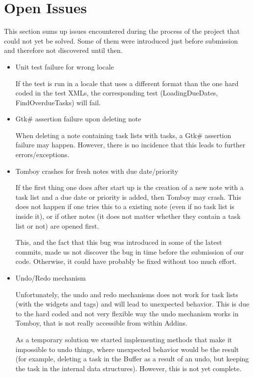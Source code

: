 \section{Open Issues}
\label{issues}

This section sums up issues encountered during the process of the project that could not yet be solved.
Some of them were introduced just before submission and therefore not discovered until then.

\begin{itemize}
\item Unit test failure for wrong locale

  If the test is run in a locale that uses a different format than the one hard coded in the test XMLs, the corresponding test (LoadingDueDates, FindOverdueTasks) will fail.

\item Gtk\# assertion failure upon deleting note

  When deleting a note containing task lists with tasks, a Gtk\# assertion failure may happen.
  However, there is no incidence that this leads to further errors/exceptions.

\item Tomboy crashes for fresh notes with due date/priority

  If the first thing one does after start up is the creation of a new note with a task list and a due date or priority is added, then Tomboy may crash. This does not happen if one tries this to a existing note (even if no task list is inside it), or if other notes (it does not matter whether they contain a task list or not) are opened first. 
  
This, and the fact that this bug was introduced in some of the latest commits, made us not discover the bug in time before the submission of our code. Otherwise, it could have probably be fixed without too much effort.

\item Undo/Redo mechanism

  Unfortunately, the undo and redo mechanisms does not work for task lists (with the widgets and tags) and will lead to unexpected behavior. This is due to the hard coded and not very flexible way the undo mechanism works in Tomboy, that is not really accessible from within Addins.
  
  As a temporary solution we started implementing methods that make it impossible to undo things, where unexpected behavior would be the result (for example, deleting a task in the Buffer as a result of an undo, but keeping the task in the internal data structures). However, this is not yet complete.


\end{itemize}
